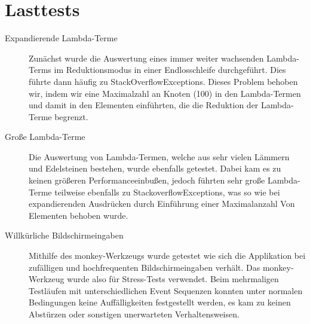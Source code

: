 \section{Lasttests}

\begin{description}
	\item[Expandierende Lambda-Terme]
	Zunächst wurde die Auswertung eines immer weiter wachsenden Lambda-Terms im Reduktionsmodus in einer Endlosschleife durchgeführt. Dies führte dann häufig zu StackOverflowExceptions. Dieses Problem behoben wir, indem wir eine Maximalzahl an Knoten (100) in den Lambda-Termen und damit in den Elementen einführten, die die Reduktion der Lambda-Terme begrenzt.
	
	\item[Große Lambda-Terme]
	Die Auswertung von Lambda-Termen, welche aus sehr vielen Lämmern und Edelsteinen bestehen, wurde ebenfalls getestet. Dabei kam es zu keinen größeren Performanceeinbußen, jedoch führten sehr große Lambda-Terme teilweise ebenfalls zu StackoverflowExceptions, was so wie bei expandierenden Ausdrücken durch Einführung einer Maximalanzahl Von Elementen behoben wurde. 
		
	\item[Willkürliche Bildschirmeingaben]
	Mithilfe des monkey-Werkzeugs wurde getestet wie sich die Applikation bei zufälligen und hochfrequenten Bildschirmeingaben verhält. Das monkey-Werkzeug wurde also für Stress-Tests verwendet. Beim mehrmaligen Testläufen mit unterschiedlichen Event Sequenzen konnten unter normalen Bedingungen keine Auffälligkeiten festgestellt werden, es kam zu keinen Abstürzen oder sonstigen unerwarteten Verhaltensweisen.
	
		
\end{description}
